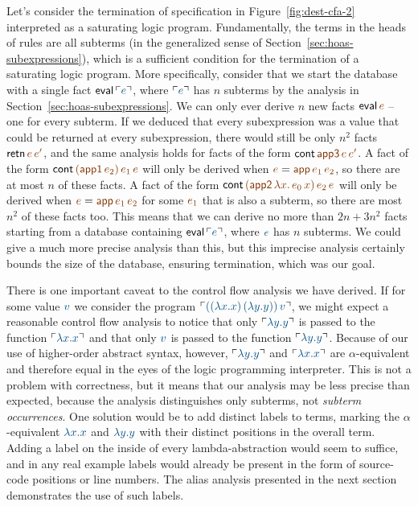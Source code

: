Let's consider the termination of specification in
Figure~\ref{fig:dest-cfa-2} interpreted as a saturating logic program.
Fundamentally, the terms in the heads of rules are all subterms (in
the generalized sense of Section~\ref{sec:hoas-subexpressions}), which
is a sufficient condition for the termination of a saturating logic
program. More specifically, consider that we start the database with a
single fact ${\sf eval}\,\interp{e}$, where $\interp{e}$ has $n$
subterms by the analysis in Section~\ref{sec:hoas-subexpressions}.  We
can only ever derive $n$ new facts ${\sf eval}\,\lf{e}$ -- one for
every subterm. If we deduced that every subexpression was a value that
could be returned at every subexpression, there would still be only
$n^2$ facts ${\sf retn}\,\lf{e}\,\lf{e'}$, and the same analysis holds
for facts of the form ${\sf cont}\,\lf{\sf app3}\,\lf{e}\,\lf{e'}$.  A
fact of the form ${\sf cont}\,\lf{({\sf
    app1}\,e_2)}\,\lf{e_1}\,\lf{e}$ will only be derived when $\lf{e}
= \lf{{\sf app}\,e_1\,e_2}$, so there are at most $n$ of these
facts. A fact of the form ${\sf cont}\,\lf{({\sf app2}\,\lambda
  x.\,e_0\,x)}\,\lf{e_2}\,\lf{e}$ will only be derived when $\lf{e} =
\lf{{\sf app}\,\lf{e_1}\,\lf{e_2}}$ for some $\lf{e_1}$ that is also a
subterm, so there are most $n^2$ of these facts too. This means that
we can derive no more than $2n + 3n^2$ facts starting from a database
containing ${\sf eval}\,\interp{e}$, where $\obj{e}$ has $n$ subterms.
We could give a much more precise analysis than this, but this
imprecise analysis certainly bounds the size of the database, ensuring
termination, which was our goal.

There is one important caveat to the control flow analysis we have derived. 
If for some value
$\obj{v}$ we consider the program $\interp{((\lambda x.x)\,(\lambda
  y.y))\,v}$, we might expect a reasonable control flow analysis to
notice that only $\interp{\lambda y.y}$ is passed to the function
$\interp{\lambda x.x}$ and that only $\obj{v}$ is passed to the
function $\interp{\lambda y.y}$. Because of our use of higher-order
abstract syntax, however, $\interp{\lambda y.y}$ and $\interp{\lambda
  x.x}$ are $\alpha$-equivalent and therefore equal in the eyes of the
logic programming interpreter. This is not a problem with correctness,
but it means that our analysis may be less precise than expected,
because the analysis distinguishes only subterms, not {\it subterm
  occurrences}. One solution would be to add distinct labels to terms,
marking the $\alpha$-equivalent $\obj{\lambda x.x}$ and $\obj{\lambda
  y.y}$ with their distinct positions in the overall term. Adding a
label on the inside of every lambda-abstraction would seem to suffice,
and in any real example labels would already be present in the form of
source-code positions or line numbers. The alias analysis presented in
the next section demonstrates the use of such labels.


